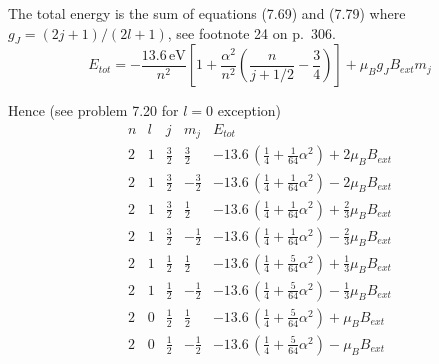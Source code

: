 


The total energy is the sum of equations (7.69) and (7.79) where
$g_J=(2j+1)/(2l+1)$, see footnote 24 on p.~306.
\begin{equation*}
E_{tot}=-\frac{13.6\,\text{eV}}{n^2}
\left[
1+\frac{\alpha^2}{n^2}\left(\frac{n}{j+1/2}-\frac{3}{4}\right)
\right]+\mu_Bg_JB_{ext}m_j
\end{equation*}

Hence (see problem 7.20 for $l=0$ exception)
\begin{equation*}
\begin{matrix}
n & l & j & m_j & E_{tot}
\\[1ex]
2 & 1 & \frac{3}{2} & \frac{3}{2} &
-13.6\,\left(\tfrac{1}{4}+\tfrac{1}{64}\alpha^2\right)+2\mu_BB_{ext}
\\[1ex]
2 & 1 & \frac{3}{2} & -\frac{3}{2} &
-13.6\,\left(\tfrac{1}{4}+\tfrac{1}{64}\alpha^2\right)-2\mu_BB_{ext}
\\[1ex]
2 & 1 & \frac{3}{2} & \frac{1}{2} &
-13.6\,\left(\tfrac{1}{4}+\tfrac{1}{64}\alpha^2\right)+\frac{2}{3}\mu_BB_{ext}
\\[1ex]
2 & 1 & \frac{3}{2} & -\frac{1}{2} &
-13.6\,\left(\tfrac{1}{4}+\tfrac{1}{64}\alpha^2\right)-\frac{2}{3}\mu_BB_{ext}
\\[1ex]
2 & 1 & \frac{1}{2} & \frac{1}{2} &
-13.6\,\left(\tfrac{1}{4}+\tfrac{5}{64}\alpha^2\right)+\frac{1}{3}\mu_BB_{ext}
\\[1ex]
2 & 1 & \frac{1}{2} & -\frac{1}{2} &
-13.6\,\left(\tfrac{1}{4}+\tfrac{5}{64}\alpha^2\right)-\frac{1}{3}\mu_BB_{ext}
\\[1ex]
2 & 0 & \frac{1}{2} & \frac{1}{2} &
-13.6\,\left(\tfrac{1}{4}+\tfrac{5}{64}\alpha^2\right)+\mu_BB_{ext}
\\[1ex]
2 & 0 & \frac{1}{2} & -\frac{1}{2} &
-13.6\,\left(\tfrac{1}{4}+\tfrac{5}{64}\alpha^2\right)-\mu_BB_{ext}
\end{matrix}
\end{equation*}


